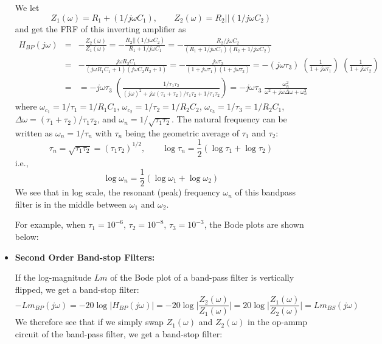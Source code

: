 \documentclass{article}
\begin{document}
\begin{itemize}
  We let 
  \begin{equation}
    Z_1(\omega)=R_1+(1/j\omega C_1),\;\;\;\;\;\;\;
    Z_2(\omega)=R_2||(1/j\omega C_2)
  \end{equation}
  and get the FRF of this inverting amplifier as
  \begin{eqnarray}
    H_{BP}(j\omega)&=&-\frac{Z_2(\omega)}{Z_1(\omega)}
    =-\frac{R_2||(1/j\omega C_2)}{R_1+1/j\omega C_1}
    =-\frac{R_2/j\omega C_2}{(R_1+1/j\omega C_1)(R_2+1/j\omega C_2)}
    \nonumber \\
    &=&-\frac{j\omega R_2C_1}{(j\omega R_1C_1+1)(j\omega C_2R_2+1)}
    =-\frac{j\omega \tau_3}{(1+j\omega \tau_1)(1+j\omega \tau_2)} 
    =-\left(j\omega\tau_3\right)\;\left(\frac{1}{1+j\omega\tau_1}\right)
    \;\left(\frac{1}{1+j\omega\tau_2}\right)
    \nonumber \\
    &=&
    =-j\omega\tau_3\;
    \left(\frac{1/\tau_1\tau_2}{(j\omega)^2+j\omega(\tau_1+\tau_2)/\tau_1\tau_2+1/\tau_1\tau_2}\right)
    =-j\omega\tau_3\;\frac{\omega_n^2}{\omega^2+j\omega\Delta\omega+\omega_n^2}
  \end{eqnarray} 
  where $\omega_{c_1}=1/\tau_1=1/R_1C_1$, $\omega_{c_2}=1/\tau_2=1/R_2C_2$, 
  $\omega_{c_3}=1/\tau_3=1/R_2C_1$, $\Delta\omega=(\tau_1+\tau_2)/\tau_1\tau_2$,
  and $\omega_n=1/\sqrt{\tau_1\tau_2}$. The natural frequency can be
  written as $\omega_n=1/\tau_n$ with $\tau_n$ being the geometric average 
  of $\tau_1$ and $\tau_2$:
  \begin{equation}
    \tau_n=\sqrt{\tau_1\tau_2}=(\tau_1\tau_2)^{1/2},\;\;\;\;\;\;\;
    \log\tau_n=\frac{1}{2}\left(\log\tau_1+\log\tau_2\right)
  \end{equation}
  i.e.,
  \begin{equation}
    \log\omega_n=\frac{1}{2}\left(\log\omega_1+\log\omega_2\right)
  \end{equation}
  We see that in log scale, the resonant (peak) frequency $\omega_n$ 
  of this bandpass filter is in the middle between $\omega_1$ and 
  $\omega_2$.

  For example, when $\tau_1=10^{-6}$, $\tau_2=10^{-8}$, $\tau_3=10^{-3}$, 
  the Bode plots are shown below:


\item {\bf Second Order Band-stop Filters:}

  If the log-magnitude $Lm$ of the Bode plot of a band-pass filter is 
  vertically flipped, we get a band-stop filter:
  \begin{equation}
  -Lm_{BP}(j\omega)=-20\log |H_{BP}(j\omega)|
  =-20\log \bigg| \frac{Z_2(\omega)}{Z_1(\omega)} \bigg|
  =20\log \bigg| \frac{Z_1(\omega)}{Z_2(\omega)} \bigg|
  =Lm_{BS}(j\omega)
  \end{equation}
  We therefore see that if we simply swap $Z_1(\omega)$ and $Z_2(\omega)$ 
  in the op-ammp circuit of the band-pass filter, we get a band-stop filter:


\end{itemize}
\end{document}
